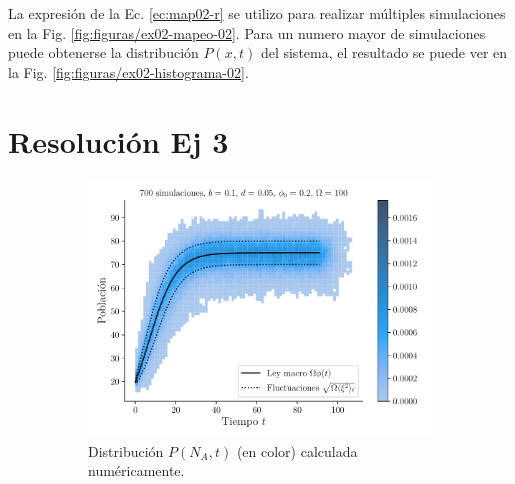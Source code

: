 \documentclass[twocolumn,aps,prl]{revtex4-1}
\begin{document}
La expresión de la Ec. \ref{ec:map02-r} se utilizo para realizar múltiples simulaciones en la Fig. \ref{fig:figuras/ex02-mapeo-02}. Para un numero mayor de simulaciones puede obtenerse la distribución $P(x,t)$ del sistema, el resultado se puede ver en la Fig. \ref{fig:figuras/ex02-histograma-02}.

\section{Resolución Ej 3}



\begin{figure}[ht!]
  \centering
  \begin{subfigure}[b]{0.49\linewidth}
      \centering
      \includegraphics[width = 0.999\textwidth]{figuras/ex03-a.pdf}
      \caption{Distribución $P(N_A,t)$ (en color) calculada numéricamente.}
      \label{fig:figuras/ex03-a}
  \end{subfigure}\quad
  \begin{subfigure}[b]{0.49\linewidth}
      \centering

\end{subfigure}
\end{figure}
\end{document}
